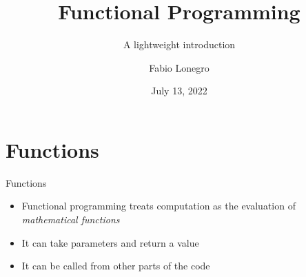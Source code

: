 \documentclass[table]{cubeamer}
\title{Functional Programming}
\subtitle{A lightweight introduction}
\author[Fabio Lonegro]{Fabio Lonegro}
\date{July 13, 2022}
\begin{document}
\maketitle

\cutoc

\section{Functions}

\begin{frame}{Functions}
  \begin{itemize}
    \item Functional programming treats computation as the evaluation of \textit{mathematical functions}
    \pause\item It can take parameters and return a value
    \pause\item It can be called from other parts of the code
  \end{itemize}
\end{frame}


    
\end{document}
